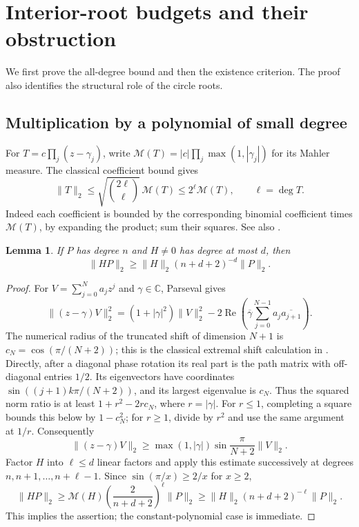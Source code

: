 \documentclass[11pt]{article}
\newtheorem{lemma}[theorem]{Lemma}
\theoremstyle{remark}\newtheorem{remark}[theorem]{Remark}
\newcommand{\C}{\mathbb C}
\newcommand{\norm}[1]{\lVert #1\rVert}
\newcommand{\Rea}{\operatorname{Re}}
\begin{document}
\section{Interior-root budgets and their obstruction}\label{sec:count}
We first prove the all-degree bound and then the existence criterion.
The proof also identifies the structural role of the circle roots.

\subsection{Multiplication by a polynomial of small degree}
For \(T=c\prod_j(z-\gamma_j)\), write
\(\mathcal M(T)=|c|\prod_j\max(1,|\gamma_j|)\) for its Mahler measure.
The classical coefficient bound gives
\begin{equation}\label{eq:mahlercoef}
 \norm T_2\le\sqrt{\binom{2\ell}{\ell}}\,\mathcal M(T)
            \le2^\ell\mathcal M(T),\qquad \ell=\deg T.
\end{equation}
Indeed each coefficient is bounded by the corresponding binomial
coefficient times \(\mathcal M(T)\), by expanding the product;
sum their squares. See also \cite[Lemma 1.6 and Exercise 1.11]{brunault}.

\begin{lemma}\label{lem:smallproduct}
If \(P\) has degree \(n\) and \(H\ne0\) has degree at most \(d\), then
\[
 \norm{HP}_2\ge\norm H_2(n+d+2)^{-d}\norm P_2.
\]
\end{lemma}
\begin{proof}
For \(V=\sum_{j=0}^Na_jz^j\) and \(\gamma\in\C\), Parseval gives
\[
 \norm{(z-\gamma)V}_2^2=(1+|\gamma|^2)\norm V_2^2
 -2\Rea\left(\overline\gamma
            \sum_{j=0}^{N-1}a_j\overline{a_{j+1}}\right).
\]
The numerical radius of the truncated shift of dimension \(N+1\)
is \(c_N=\cos(\pi/(N+2))\); this is the classical extremal shift
calculation in \cite{haagerup}. Directly, after a diagonal phase
rotation its real part is the path matrix with off-diagonal entries
\(1/2\). Its eigenvectors have coordinates
\(\sin((j+1)k\pi/(N+2))\), and its largest eigenvalue is \(c_N\).
Thus the squared norm ratio is at least \(1+r^2-2rc_N\), where
\(r=|\gamma|\). For \(r\le1\), completing a square bounds this
below by \(1-c_N^2\); for \(r\ge1\), divide by \(r^2\) and use
the same argument at \(1/r\). Consequently
\[
 \norm{(z-\gamma)V}_2\ge
 \max(1,|\gamma|)\sin\frac{\pi}{N+2}\norm V_2.
\]
Factor \(H\) into \(\ell\le d\) linear factors and apply this
estimate successively at degrees \(n,n+1,\ldots,n+\ell-1\).
Since \(\sin(\pi/x)\ge2/x\) for \(x\ge2\),
\[
 \norm{HP}_2\ge\mathcal M(H)
       \left(\frac2{n+d+2}\right)^\ell\norm P_2
 \ge\norm H_2(n+d+2)^{-\ell}\norm P_2.
\]
This implies the assertion; the constant-polynomial case is immediate.
\end{proof}
\end{document}
